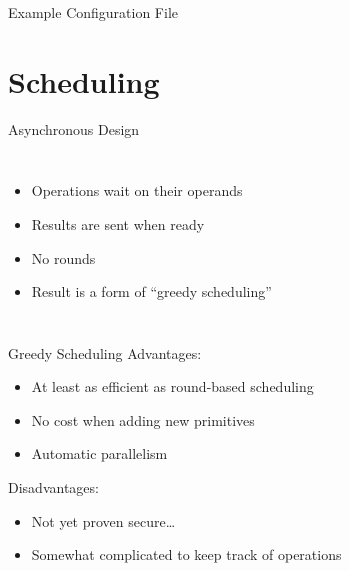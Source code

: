 \documentclass[t,noamsthm]{beamer}
\begin{document}
\begin{frame}{Example Configuration File}


  

\end{frame}

\section{Scheduling}

\begin{frame}{Asynchronous Design}

  \begin{columns}




    \begin{itemize}
    \item Operations wait on their operands
    \item Results are sent when ready
    \item No rounds
    \item Result is a form of ``greedy scheduling''
    \end{itemize}

  \end{columns}

\end{frame}

\begin{frame}{Greedy Scheduling}
  Advantages:
  \begin{itemize}
  \item At least as efficient as round-based scheduling
  \item No cost when adding new primitives
  \item Automatic parallelism
  \end{itemize}

  Disadvantages:
  \begin{itemize}
  \item Not yet proven secure\dots
  \item Somewhat complicated to keep track of operations
  \end{itemize}
\end{frame}
\end{document}
